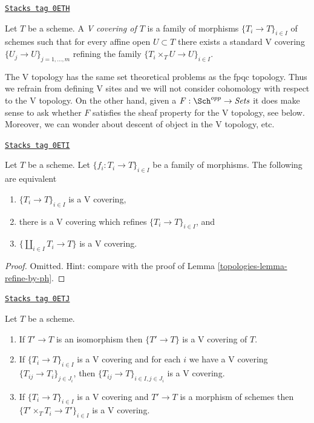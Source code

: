 \begin{definition}[V covering]
\label{topologies-definition-V-covering}
\href{https://stacks.math.columbia.edu/tag/0ETH}{\texttt{Stacks tag 0ETH}}

Let $T$ be a scheme. A {\it V covering of $T$} is a family
of morphisms $\{T_i \to T\}_{i \in I}$ of schemes such that for every
affine open $U \subset T$ there exists a standard V covering
$\{U_j \to U\}_{j = 1, \ldots, m}$ refining the family
$\{T_i \times_T U \to U\}_{i \in I}$.
\end{definition}

The V topology has the same set theoretical problems as
the fpqc topology. Thus we refrain from defining V sites
and we will not consider cohomology with respect to the V topology.
On the other hand, given a
$F : \Sch^{opp} \to \textit{Sets}$
it does make sense to ask whether $F$ satisfies the sheaf property
for the V topology, see below.
Moreover, we can wonder about descent of object
in the V topology, etc.

\begin{lemma}[Refine by V]
\label{topologies-lemma-refine-by-V}
\href{https://stacks.math.columbia.edu/tag/0ETI}{\texttt{Stacks tag 0ETI}}

Let $T$ be a scheme. Let $\{f_i : T_i \to T\}_{i \in I}$ be a family
of morphisms. The following are equivalent
\begin{enumerate}
\item $\{T_i \to T\}_{i \in I}$ is a V covering,
\item there is a V covering which refines $\{T_i \to T\}_{i \in I}$, and
\item $\{\coprod_{i \in I} T_i \to T\}$ is a V covering.
\end{enumerate}
\end{lemma}

\begin{proof}

Omitted. Hint: compare with the proof of
Lemma \ref{topologies-lemma-refine-by-ph}.
\end{proof}

\begin{lemma}[V]
\label{topologies-lemma-V}
\href{https://stacks.math.columbia.edu/tag/0ETJ}{\texttt{Stacks tag 0ETJ}}

Let $T$ be a scheme.
\begin{enumerate}
\item If $T' \to T$ is an isomorphism then $\{T' \to T\}$
is a V covering of $T$.
\item If $\{T_i \to T\}_{i\in I}$ is a V covering and for each
$i$ we have a V covering $\{T_{ij} \to T_i\}_{j\in J_i}$, then
$\{T_{ij} \to T\}_{i \in I, j\in J_i}$ is a V covering.
\item If $\{T_i \to T\}_{i\in I}$ is a V covering
and $T' \to T$ is a morphism of schemes then
$\{T' \times_T T_i \to T'\}_{i\in I}$ is a V covering.
\end{enumerate}
\end{lemma}

